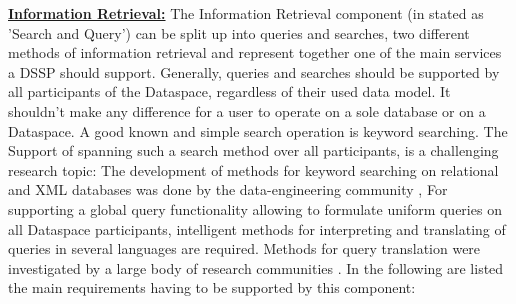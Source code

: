 \uline{\textbf{Information Retrieval:}} The Information Retrieval component (in \cite{Halevy:2006:PDS:1142351.1142352} stated as 'Search and Query') can be split up into queries and searches, two different methods of information retrieval and represent together one of the main services a DSSP should support. Generally, queries and searches should be supported by all participants of the Dataspace, regardless of their used data model. It shouldn't make any difference for a user to operate on a sole database or on a Dataspace. A good known and simple search operation is keyword searching. The Support of spanning such a search method over all participants, is a challenging research topic: The development of methods for keyword searching on relational and XML databases was done by the data-engineering community \cite{994693, Guo:2003:XRK:872757.872762, Hristidis:2002:DKS:1287369.1287427}, For supporting a global query functionality allowing to formulate uniform queries on all Dataspace participants, intelligent methods for interpreting and translating of queries in several languages are required. Methods for query translation were investigated by a large body of research communities \cite{Carey00xperanto:publishing, 1319983}.
In the following are listed the main requirements having to be supported by this component:
